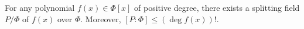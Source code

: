 For any polynomial $f(x) \in \Phi[x]$ of positive degree, there exists a splitting field $P/\Phi$ of $f(x)$ over $\Phi$. Moreover, $[P:\Phi] \leq (\deg f(x))!$.
